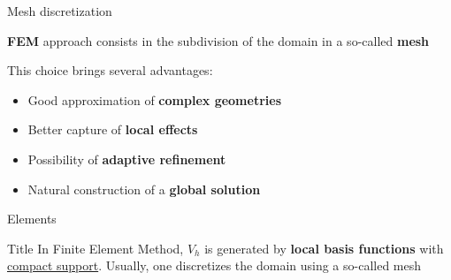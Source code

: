 \documentclass[10pt,externalviewer]{beamer}
\begin{document}
\begin{frame}{Mesh discretization}
   \begin{center}
      \begin{framed}
         \textbf{FEM} approach consists in the subdivision of the domain in a so-called \textbf{\textcolor{BrickRed}{mesh}}
      \end{framed}
   \end{center}

   \pause

   This choice brings several advantages:

   \begin{itemize}
      \item Good approximation of \textbf{complex geometries}
      \item Better capture of \textbf{local effects}
      \item Possibility of \textbf{adaptive refinement}
      \item Natural construction of a \textbf{global solution}
   \end{itemize}

\end{frame}

\begin{frame}{Elements}
   \begin{figure}[H]
      \centering
   \end{figure}
\end{frame}

\begin{frame}{Title}
   In \textcolor{BrickRed}{F}inite \textcolor{BrickRed}{E}lement \textcolor{BrickRed}{M}ethod, $V_h$ is generated by \textbf{local basis functions} with \underline{compact support}. Usually, one discretizes the domain using a so-called mesh
\end{frame}
\end{document}
